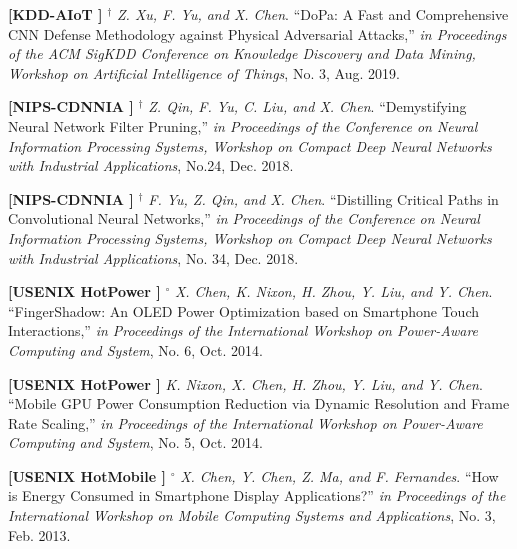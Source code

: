 	\textbf{[KDD-AIoT ]}
	$^\dagger$
	\textsl{Z. Xu, F. Yu, and X. Chen}.
		``DoPa: A Fast and Comprehensive CNN Defense Methodology against Physical Adversarial Attacks,''
		\textsl{in Proceedings of the ACM SigKDD Conference on Knowledge Discovery and Data Mining, Workshop on Artificial Intelligence of Things}, No. 3, Aug. 2019.
			\vspace{-3mm}

	\textbf{[NIPS-CDNNIA ]}
	$^\dagger$
	\textsl{Z. Qin, F. Yu, C. Liu, and X. Chen}.
		``Demystifying Neural Network Filter Pruning,''
		\textsl{in Proceedings of the Conference on Neural Information Processing Systems, Workshop on Compact Deep Neural Networks with Industrial Applications}, No.24, Dec. 2018.
			\vspace{-3mm}

	\textbf{[NIPS-CDNNIA ]}
	$^\dagger$
	\textsl{F. Yu, Z. Qin, and X. Chen}.
		``Distilling Critical Paths in Convolutional Neural Networks,''
		\textsl{in Proceedings of the Conference on Neural Information Processing Systems, Workshop on Compact Deep Neural Networks with Industrial Applications}, No. 34, Dec. 2018.
			\vspace{-3mm}

	\textbf{[USENIX HotPower ]}
	$^\circ$
	\textsl{X. Chen, K. Nixon, H. Zhou, Y. Liu, and Y. Chen}.
		``FingerShadow\@: An OLED Power Optimization based on Smartphone Touch Interactions,''
		\textsl{in Proceedings of the International Workshop on Power-Aware Computing and System}, No. 6, Oct. 2014.
			\vspace{-3mm}

	\textbf{[USENIX HotPower ]}\hspace{2mm}
	\textsl{K. Nixon, X. Chen, H. Zhou, Y. Liu, and Y. Chen}.
		``Mobile GPU Power Consumption Reduction via Dynamic Resolution and Frame Rate Scaling,''
		\textsl{in Proceedings of the International Workshop on Power-Aware Computing and System}, No. 5, Oct. 2014.
			\vspace{-3mm}

	\textbf{[USENIX HotMobile ]}
	$^\circ$
	\textsl{X. Chen, Y. Chen, Z. Ma, and F. Fernandes}.
		``How is Energy Consumed in Smartphone Display Applications?''
			\textsl{in Proceedings of the International Workshop on Mobile Computing Systems and Applications}, No. 3, Feb. 2013.
			\vspace{-3mm}

